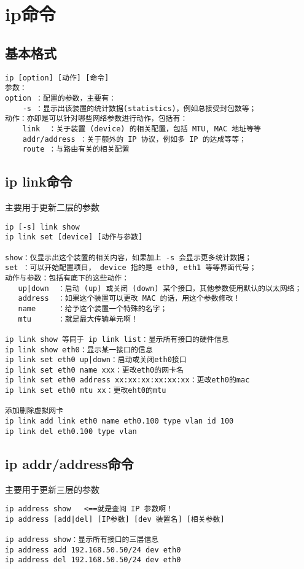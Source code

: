 \documentclass[a4paper,left=1.5cm,right=1.5cm,11pt]{article}
\begin{document}
\section{ip命令}
\subsection{基本格式}
\begin{lstlisting}
ip [option] [动作] [命令]
参数：
option ：配置的参数，主要有：
    -s ：显示出该装置的统计数据(statistics)，例如总接受封包数等；
动作：亦即是可以针对哪些网络参数进行动作，包括有：
    link  ：关于装置 (device) 的相关配置，包括 MTU, MAC 地址等等
    addr/address ：关于额外的 IP 协议，例如多 IP 的达成等等；
    route ：与路由有关的相关配置
\end{lstlisting}
\subsection{ip link命令}
主要用于更新二层的参数
\begin{lstlisting}
ip [-s] link show
ip link set [device] [动作与参数]

show：仅显示出这个装置的相关内容，如果加上 -s 会显示更多统计数据；
set ：可以开始配置项目， device 指的是 eth0, eth1 等等界面代号；
动作与参数：包括有底下的这些动作：
   up|down  ：启动 (up) 或关闭 (down) 某个接口，其他参数使用默认的以太网络；
   address  ：如果这个装置可以更改 MAC 的话，用这个参数修改！
   name     ：给予这个装置一个特殊的名字；
   mtu      ：就是最大传输单元啊！

ip link show 等同于 ip link list：显示所有接口的硬件信息
ip link show eth0：显示某一接口的信息
ip link set eth0 up|down：启动或关闭eth0接口
ip link set eth0 name xxx：更改eth0的网卡名
ip link set eth0 address xx:xx:xx:xx:xx:xx：更改eth0的mac
ip link set eth0 mtu xx：更改eht0的mtu

添加删除虚拟网卡
ip link add link eth0 name eth0.100 type vlan id 100
ip link del eth0.100 type vlan
\end{lstlisting}
\subsection{ip addr/address命令}
主要用于更新三层的参数
\begin{lstlisting}
ip address show   <==就是查阅 IP 参数啊！
ip address [add|del] [IP参数] [dev 装置名] [相关参数]

ip address show：显示所有接口的三层信息
ip address add 192.168.50.50/24 dev eth0
ip address del 192.168.50.50/24 dev eth0
\end{lstlisting}
\end{document}
